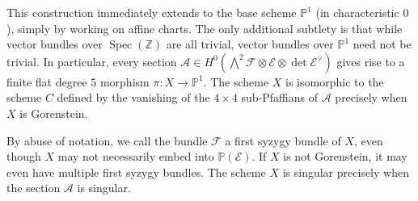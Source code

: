 \documentclass[11pt]{amsart}
\numberwithin{theorem}{section}
\numberwithin{equation}{section}
\theoremstyle{definition}\newtheorem{defn}[theorem]{Definition}
\theoremstyle{definition}\newtheorem{remark}[theorem]{Remark}
\theoremstyle{definition}\newtheorem{question}[theorem]{Question}
\theoremstyle{definition}\newtheorem{problem}[theorem]{Problem}
\newcommand{\ZZ}{\mathbb{Z}}
\newcommand{\PP}{\mathbb{P}}
\newcommand{\cE}{\mathcal{E}}
\newcommand{\cF}{\mathcal{F}}
\newcommand{\cA}{\mathcal{A}}
\DeclareMathOperator{\Spec}{Spec}
\begin{document}
This construction immediately extends to the base scheme $\PP^1$ (in characteristic $0$), simply by working on affine charts. The only additional subtlety is that while vector bundles over $\Spec(\ZZ)$ are all trivial, vector bundles over $\PP^1$ need not be trivial. In particular, every section $\cA \in H^0(\bigwedge\nolimits^2 \cF \otimes \cE \otimes \det \cE^\vee )$ gives rise to a finite flat degree $5$ morphism $\pi \colon X \rightarrow \PP^1$. The scheme $X$ is isomorphic to the scheme $C$ defined by the vanishing of the $4 \times 4$ sub-Pfaffians of $\cA$ precisely when $X$ is Gorenstein. 

By abuse of notation, we call the bundle $\cF$ a first syzygy bundle of $X$, even though $X$ may not necessarily embed into $\PP(\cE)$. If $X$ is not Gorenstein, it may even have multiple first syzygy bundles. The scheme $X$ is singular precisely when the section $\cA$ is singular.
\end{document}
